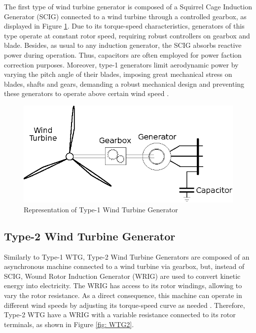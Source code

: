 The first type of wind turbine generator is composed of a Squirrel Cage Induction Generator (SCIG) connected to a wind turbine through a controlled gearbox, as displayed in Figure \ref{fig: WTG1}. Due to its torque-speed characteristics, generators of this type operate at constant rotor speed, requiring robust controllers on gearbox and blade. Besides, as usual to any induction generator, the SCIG absorbs reactive power during operation. Thus, capacitors are often employed for power faction correction purposes. Moreover, type-1 generators limit aerodynamic power by varying the pitch angle of their blades, imposing great mechanical stress on blades, shafts and gears, demanding a robust mechanical design and preventing these generators to operate above certain wind speed \cite{Ellis2011}. 

\begin{figure}[h]
	\caption{Representation of Type-1 Wind Turbine Generator}
	\begin{center}
		\includegraphics[scale=1]{Images/Type1WTG.eps}
	\end{center}
	\label{fig: WTG1}
\end{figure}

\subsection{Type-2 Wind Turbine Generator}

Similarly to Type-1 WTG, Type-2 Wind Turbine Generators are composed of an asynchronous machine connected to a wind turbine via gearbox, but, instead of SCIG, Wound Rotor Induction Generator (WRIG) are used to convert kinetic energy into electricity. The WRIG has access to its rotor windings, allowing to vary the rotor resistance. As a direct consequence, this machine can operate in different wind speeds by adjusting its torque-speed curve as needed \cite{Ellis2011}. Therefore, Type-2 WTG have a WRIG with a variable resistance connected to its rotor terminals, as shown in Figure \ref{fig: WTG2}.

